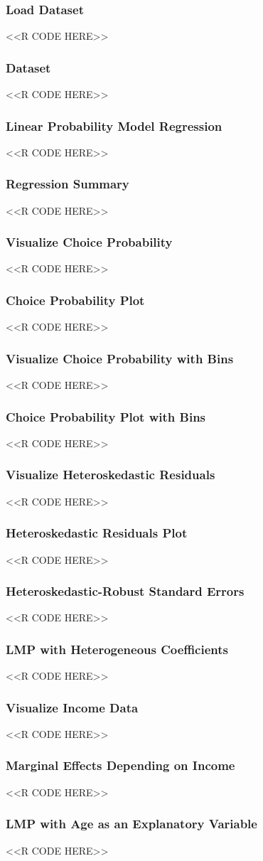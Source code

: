 \documentclass{beamer}
\begin{document}
\begin{frame}[fragile]\frametitle{Load Dataset}
    <<R CODE HERE>>
\end{frame}

\begin{frame}[fragile]\frametitle{Dataset}
    <<R CODE HERE>>
\end{frame}

\begin{frame}[fragile]\frametitle{Linear Probability Model Regression}
    <<R CODE HERE>>
\end{frame}

\begin{frame}[fragile]\frametitle{Regression Summary}
    <<R CODE HERE>>
\end{frame}

\begin{frame}[fragile]\frametitle{Visualize Choice Probability}
    <<R CODE HERE>>
\end{frame}

\begin{frame}[fragile]\frametitle{Choice Probability Plot}
    <<R CODE HERE>>
\end{frame}

\begin{frame}[fragile]\frametitle{Visualize Choice Probability with Bins}
    <<R CODE HERE>>
\end{frame}

\begin{frame}[fragile]\frametitle{Choice Probability Plot with Bins}
    <<R CODE HERE>>
\end{frame}

\begin{frame}[fragile]\frametitle{Visualize Heteroskedastic Residuals}
    <<R CODE HERE>>
\end{frame}

\begin{frame}[fragile]\frametitle{Heteroskedastic Residuals Plot}
    <<R CODE HERE>>
\end{frame}

\begin{frame}[fragile]\frametitle{Heteroskedastic-Robust Standard Errors}
    <<R CODE HERE>>
\end{frame}

\begin{frame}[fragile]\frametitle{LMP with Heterogeneous Coefficients}
    <<R CODE HERE>>
\end{frame}

\begin{frame}[fragile]\frametitle{Visualize Income Data}
    <<R CODE HERE>>
\end{frame}

\begin{frame}[fragile]\frametitle{Marginal Effects Depending on Income}
    <<R CODE HERE>>
\end{frame}

\begin{frame}[fragile]\frametitle{LMP with Age as an Explanatory Variable}
    <<R CODE HERE>>
\end{frame}
\end{document}
